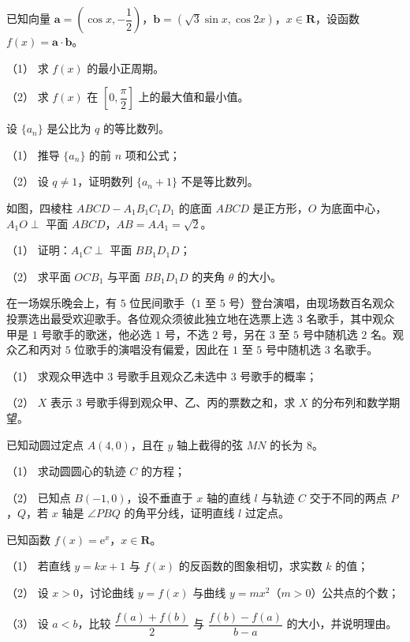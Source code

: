 \begin{question}
已知向量 $\boldsymbol a=\left(\cos x,-\dfrac12\right)$，$\boldsymbol b=\left(\sqrt3\sin x,\cos2x\right)$，$x\in\mathbf R$，设函数 $f(x)=\boldsymbol a\cdot\boldsymbol b$。

（1） 求 $f(x)$ 的最小正周期。

（2） 求 $f(x)$ 在 $\left[0,\dfrac\pi2\right]$ 上的最大值和最小值。

\end{question}
\begin{question}
设 $\{a_n\}$ 是公比为 $q$ 的等比数列。

（1） 推导 $\{a_n\}$ 的前 $n$ 项和公式；

（2） 设 $q\neq1$，证明数列 $\{a_n+1\}$ 不是等比数列。

\Needspace{0.4\textheight}
\end{question}
\begin{question}
如图，四棱柱 $ABCD-A_1B_1C_1D_1$ 的底面 $ABCD$ 是正方形，$O$ 为底面中心，$A_1O\perp$ 平面 $ABCD$，$AB=AA_1=\sqrt2$。

（1） 证明：$A_1C\perp$ 平面 $BB_1D_1D$；

（2） 求平面 $OCB_1$ 与平面 $BB_1D_1D$ 的夹角 $\theta$ 的大小。
\nopagebreak[4]
\begin{center}\end{center}
\nopagebreak[4]
\end{question}
\begin{question}
在一场娱乐晚会上，有 $5$ 位民间歌手（$1$ 至 $5$ 号）登台演唱，由现场数百名观众投票选出最受欢迎歌手。各位观众须彼此独立地在选票上选 $3$ 名歌手，其中观众甲是 $1$ 号歌手的歌迷，他必选 $1$ 号，不选 $2$ 号，另在 $3$ 至 $5$ 号中随机选 $2$ 名。观众乙和丙对 $5$ 位歌手的演唱没有偏爱，因此在 $1$ 至 $5$ 号中随机选 $3$ 名歌手。

（1） 求观众甲选中 $3$ 号歌手且观众乙未选中 $3$ 号歌手的概率；

（2） $X$ 表示 $3$ 号歌手得到观众甲、乙、丙的票数之和，求 $X$ 的分布列和数学期望。

\end{question}
\begin{question}
已知动圆过定点 $A(4,0)$，且在 $y$ 轴上截得的弦 $MN$ 的长为 $8$。

（1） 求动圆圆心的轨迹 $C$ 的方程；

（2） 已知点 $B(-1,0)$，设不垂直于 $x$ 轴的直线 $l$ 与轨迹 $C$ 交于不同的两点 $P$，$Q$，若 $x$ 轴是 $\angle PBQ$ 的角平分线，证明直线 $l$ 过定点。

\end{question}
\begin{question}
已知函数 $f(x)=\mathrm e^x$，$x\in\mathbf R$。

（1） 若直线 $y=kx+1$ 与 $f(x)$ 的反函数的图象相切，求实数 $k$ 的值；

（2） 设 $x>0$，讨论曲线 $y=f(x)$ 与曲线 $y=mx^2$（$m>0$）公共点的个数；

（3） 设 $a<b$，比较 $\dfrac{f(a)+f(b)}2$ 与 $\dfrac{f(b)-f(a)}{b-a}$ 的大小，并说明理由。

\end{question}